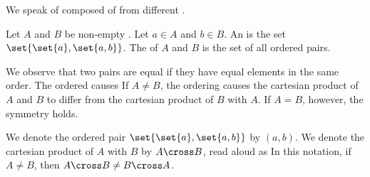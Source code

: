 
\sbasic



\sstart



We speak of
composed of
from different
.


Let $A$ and $B$ be
non-empty
.
Let $a \in A$ and
$b \in B$.
An
is the set
$\set{\set{a}, \set{a, b}}$.
The
of $A$ and $B$ is the set
of all ordered pairs.

We observe that two pairs
are equal if they have equal
elements in the same order.
The ordered causes
If $A \neq B$,
the ordering causes
the cartesian product of
$A$ and $B$
to differ from
the cartesian product of
$B$ with $A$.
If $A = B$, however, the
symmetry holds.

We denote the ordered pair
$\set{\set{a},\set{a,b}}$
by $(a, b)$.
We denote the cartesian product
of $A$ with $B$ by
$A \cross B$, read aloud as
In this notation,
if $A \neq B$, then
$A \cross B \neq B \cross A$.

\strats

